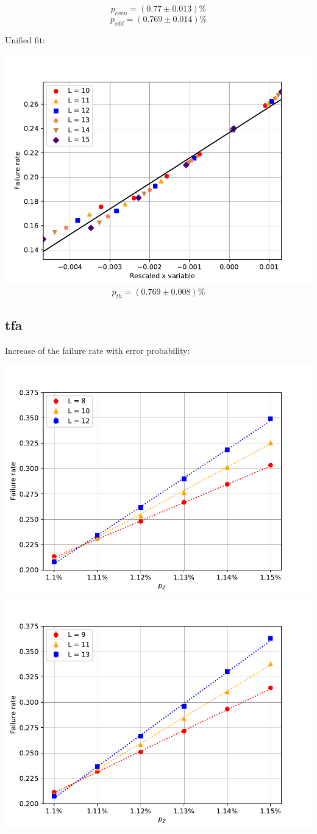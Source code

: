 \documentclass[pra]{revtex4-1}
\begin{document}
\[  p_{even} = (0.77 \pm 0.013)\% \]
\[  p_{odd} = (0.769 \pm 0.014)\% \]
\clearpage 

Unified fit: \begin{center} 

\includegraphics[width=.9\textwidth]{../graphs-paper2/sxd-dephasing-rescaled.pdf}
\[  p_{th} = (0.769 \pm 0.008)\% \] \end{center}
\clearpage 

\subsection*{tfa}
\noindent Increase of the failure rate with error probability: 
  
\includegraphics[width=.49\textwidth]{../graphs-paper2/tfa-dephasing-even.pdf}
\includegraphics[width=.49\textwidth]{../graphs-paper2/tfa-dephasing-odd.pdf}
\end{document}
